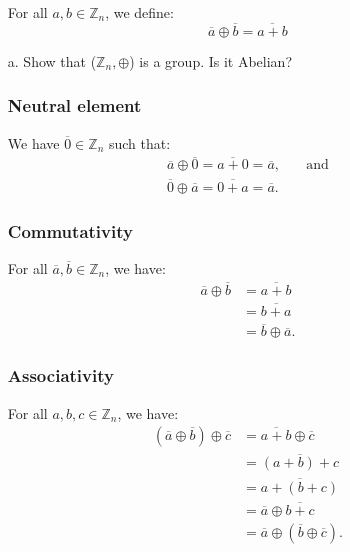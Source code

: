 \documentclass[11pt]{article}
\newcommand{\Z}{\mathbb{Z}}
\newcommand{\cls}[1]{\overline{#1}}                      %
\theoremstyle{definition}
\theoremstyle{plain}
\theoremstyle{remark}
\begin{document}
\begin{enumerate}
          For all \(a, b \in \Z_n\), we define:
          \[
              \cls{a} \oplus \cls{b} = \cls{a + b}
          \]

    \item[a.] Show that (\(\Z_n, \oplus\)) is a group. Is it Abelian?

          \subsubsection*{Neutral element}

          We have \(\cls{0} \in \Z_n\) such that:
          \[
              \begin{aligned}
                  \cls{a} \oplus \cls{0} = \cls{a + 0} = \cls{a}, & \quad \textrm{and} \\
                  \cls{0} \oplus \cls{a} = \cls{0 + a} = \cls{a}.
              \end{aligned}
          \]

          \subsubsection*{Commutativity}

          For all \(\cls{a}, \cls{b} \in \Z_n\), we have:
          \[
              \begin{aligned}
                  \cls{a} \oplus \cls{b} & = \cls{a + b}             \\
                                         & = \cls{b + a}             \\
                                         & = \cls{b} \oplus \cls{a}.
              \end{aligned}
          \]

          \subsubsection*{Associativity}

          For all \(a, b, c \in \Z_n\), we have:
          \[
              \begin{aligned}
                  (\cls{a} \oplus \cls{b}) \oplus \cls{c} & = \cls{a + b} \oplus \cls{c}               \\
                                                          & = \cls{(a + b) + c}                        \\
                                                          & = \cls{a + (b + c)}                        \\
                                                          & = \cls{a} \oplus \cls{b + c}               \\
                                                          & = \cls{a} \oplus (\cls{b} \oplus \cls{c}).
              \end{aligned}
          \]


\end{enumerate}
\end{document}
